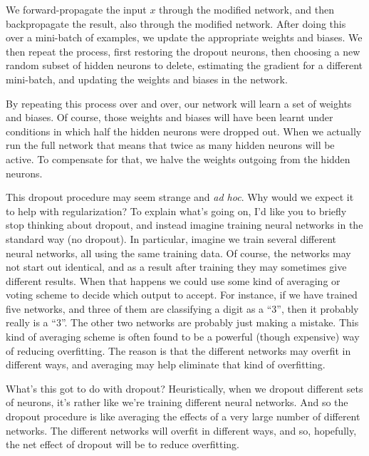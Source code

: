 \documentclass[a4paper,twoside,10pt]{book}
\begin{document}
We forward-propagate the input $x$ through the modified network, and then backpropagate the result, also through the modified network. After doing this over a mini-batch of examples, we update the appropriate weights and biases. We then repeat the process, first restoring the dropout neurons, then choosing a new random subset of hidden neurons to delete, estimating the gradient for a different mini-batch, and updating the weights and biases in the network.

By repeating this process over and over, our network will learn a set of weights and biases. Of course, those weights and biases will have been learnt under conditions in which half the hidden neurons were dropped out. When we actually run the full network that means that twice as many hidden neurons will be active. To compensate for that, we halve the weights outgoing from the hidden neurons.

This dropout procedure may seem strange and \textit{ad hoc}. Why would we expect it to help with regularization? To explain what's going on, I'd like you to briefly stop thinking about dropout, and instead imagine training neural networks in the standard way (no dropout). In particular, imagine we train several different neural networks, all using the same training data. Of course, the networks may not start out identical, and as a result after training they may sometimes give different results. When that happens we could use some kind of averaging or voting scheme to decide which output to accept. For instance, if we have trained five networks, and three of them are classifying a digit as a ``3'', then it probably really is a ``3''. The other two networks are probably just making a mistake. This kind of averaging scheme is often found to be a powerful (though expensive) way of reducing overfitting. The reason is that the different networks may overfit in different ways, and averaging may help eliminate that kind of overfitting.

What's this got to do with dropout? Heuristically, when we dropout different sets of neurons, it's rather like we're training different neural networks. And so the dropout procedure is like averaging the effects of a very large number of different networks. The different networks will overfit in different ways, and so, hopefully, the net effect of dropout will be to reduce overfitting.
\end{document}

